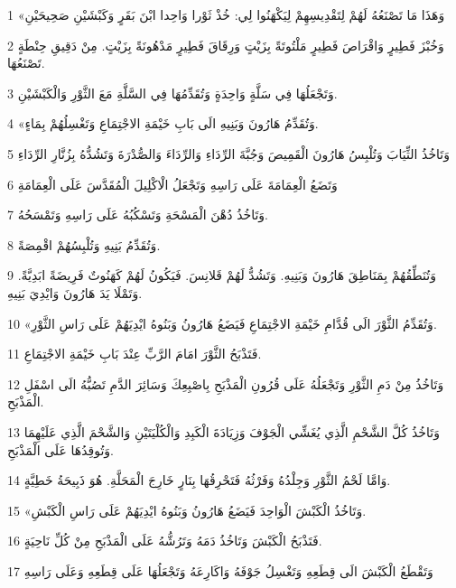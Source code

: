 \par 1 «وَهَذَا مَا تَصْنَعُهُ لَهُمْ لِتَقْدِيسِهِمْ لِيَكْهَنُوا لِي: خُذْ ثَوْرا وَاحِدا ابْنَ بَقَرٍ وَكَبْشَيْنِ صَحِيحَيْنِ
\par 2 وَخُبْزَ فَطِيرٍ وَاقْرَاصَ فَطِيرٍ مَلْتُوتَةً بِزَيْتٍ وَرِقَاقَ فَطِيرٍ مَدْهُونَةً بِزَيْتٍ. مِنْ دَقِيقِ حِنْطَةٍ تَصْنَعُهَا.
\par 3 وَتَجْعَلُهَا فِي سَلَّةٍ وَاحِدَةٍ وَتُقَدِّمُهَا فِي السَّلَّةِ مَعَ الثَّوْرِ وَالْكَبْشَيْنِ.
\par 4 «وَتُقَدِّمُ هَارُونَ وَبَنِيهِ الَى بَابِ خَيْمَةِ الاجْتِمَاعِ وَتَغْسِلُهُمْ بِمَاءٍ.
\par 5 وَتَاخُذُ الثِّيَابَ وَتُلْبِسُ هَارُونَ الْقَمِيصَ وَجُبَّةَ الرِّدَاءِ وَالرِّدَاءَ وَالصُّدْرَةَ وَتَشُدُّهُ بِزُنَّارِ الرِّدَاءِ
\par 6 وَتَضَعُ الْعِمَامَةَ عَلَى رَاسِهِ وَتَجْعَلُ الْاكْلِيلَ الْمُقَدَّسَ عَلَى الْعِمَامَةِ
\par 7 وَتَاخُذُ دُهْنَ الْمَسْحَةِ وَتَسْكُبُهُ عَلَى رَاسِهِ وَتَمْسَحُهُ.
\par 8 وَتُقَدِّمُ بَنِيهِ وَتُلْبِسُهُمْ اقْمِصَةً.
\par 9 وَتُنَطِّقُهُمْ بِمَنَاطِقَ هَارُونَ وَبَنِيهِ. وَتَشُدُّ لَهُمْ قَلانِسَ. فَيَكُونُ لَهُمْ كَهَنُوتٌ فَرِيضَةً ابَدِيَّةً. وَتَمْلَا يَدَ هَارُونَ وَايْدِيَ بَنِيهِ.
\par 10 «وَتُقَدِّمُ الثَّوْرَ الَى قُدَّامِ خَيْمَةِ الاجْتِمَاعِ فَيَضَعُ هَارُونُ وَبَنُوهُ ايْدِيَهُمْ عَلَى رَاسِ الثَّوْرِ.
\par 11 فَتَذْبَحُ الثَّوْرَ امَامَ الرَّبِّ عِنْدَ بَابِ خَيْمَةِ الاجْتِمَاعِ.
\par 12 وَتَاخُذُ مِنْ دَمِ الثَّوْرِ وَتَجْعَلُهُ عَلَى قُرُونِ الْمَذْبَحِ بِاصْبِعِكَ وَسَائِرَ الدَّمِ تَصُبُّهُ الَى اسْفَلِ الْمَذْبَحِ.
\par 13 وَتَاخُذُ كُلَّ الشَّحْمِ الَّذِي يُغَشِّي الْجَوْفَ وَزِيَادَةَ الْكَبِدِ وَالْكُلْيَتَيْنِ وَالشَّحْمَ الَّذِي عَلَيْهِمَا وَتُوقِدُهَا عَلَى الْمَذْبَحِ.
\par 14 وَامَّا لَحْمُ الثَّوْرِ وَجِلْدُهُ وَفَرْثُهُ فَتَحْرِقُهَا بِنَارٍ خَارِجَ الْمَحَلَّةِ. هُوَ ذَبِيحَةُ خَطِيَّةٍ.
\par 15 «وَتَاخُذُ الْكَبْشَ الْوَاحِدَ فَيَضَعُ هَارُونُ وَبَنُوهُ ايْدِيَهُمْ عَلَى رَاسِ الْكَبْشِ.
\par 16 فَتَذْبَحُ الْكَبْشَ وَتَاخُذُ دَمَهُ وَتَرُشُّهُ عَلَى الْمَذْبَحِ مِنْ كُلِّ نَاحِيَةٍ.
\par 17 وَتَقْطَعُ الْكَبْشَ الَى قِطَعِهِ وَتَغْسِلُ جَوْفَهُ وَاكَارِعَهُ وَتَجْعَلُهَا عَلَى قِطَعِهِ وَعَلَى رَاسِهِ
